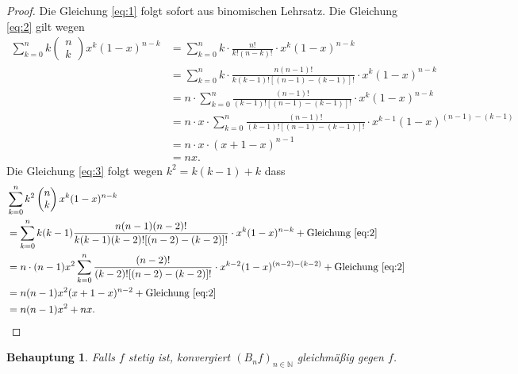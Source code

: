 \documentclass[draft,a5paper]{article}
\newtheorem*{beh}{Behauptung}
\begin{document}
\begin{proof}
  Die Gleichung \eqref{eq:1} folgt sofort aus binomischen
  Lehrsatz. Die Gleichung \eqref{eq:2} gilt wegen
  \begin{align*}
    \sum_{k=0}^n{k \begin{pmatrix} n \\ k \end{pmatrix} x^k (1 - x)^{n -
    k}}
    &= \sum_{k=0}^n{k \cdot  \frac{n!}{k! (n-k)!} \cdot x^k (1 -
      x)^{n - k}} \\
    &= \sum_{k=0}^n{k \cdot \frac{n (n-1)!}{k (k-1)! [(n-1) - (k-1)]!} \cdot x^k (1 -
      x)^{n - k}} \\
    &= n \cdot \sum_{k=0}^n {\frac{(n-1)!}{(k-1)! [(n-1) - (k-1)]!} \cdot x^k (1 -
      x)^{n - k}} \\
    &= n \cdot x \cdot \sum_{k=0}^n {\frac{(n-1)!}{(k-1)! [(n-1) - (k-1)]!} \cdot x^{k-1} (1 -
      x)^{(n - 1) - (k - 1)}} \\
    &= n \cdot x \cdot (x + 1 - x)^{n-1} \\
    &= nx.
  \end{align*}
  Die Gleichung \eqref{eq:3} folgt wegen \(k^2 = k ( k - 1 ) + k\) dass
  \begin{align*}
    & \sum_{k=0}^n{k^2 \begin{pmatrix} n \\ k \end{pmatrix} x^k (1 -
      x)^{n - k}} \\
    &= \sum_{k=0}^n{k (k - 1) \frac{n (n - 1) (n - 2)!}{k (k - 1) (k -
      2)! [(n - 2) - (k - 2)]!} \cdot x^k (1 -  x)^{n - k}}
      + \text{Gleichung \eqref{eq:2}} \\
    &= n \cdot (n - 1) x^2 \sum_{k=0}^n{\frac{(n - 2)!}{(k - 2)! [(n -
      2) - (k - 2)]!} \cdot x^{k - 2} (1 - x)^{(n - 2) - (k - 2)}}
      + \text{Gleichung \eqref{eq:2}} \\
    &= n(n-1)x^2 (x + 1 - x)^{n-2} + \text{Gleichung \eqref{eq:2}} \\
    &= n(n-1)x^2 + nx.
  \end{align*}
\end{proof}

\begin{beh}
  Falls \(f\) stetig ist, konvergiert \((B_n f)_{n \in \mathbb{N}}\)
  gleichmäßig gegen \(f\).
\end{beh}
\end{document}
